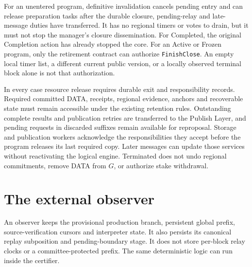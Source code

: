 \documentclass[11pt,a4paper]{article}
\begin{document}
For an unentered program, definitive invalidation cancels pending
entry and can release preparation tasks after the durable closure,
pending-relay and late-message duties have transferred. It has no
regional timers or votes to drain, but it must not stop the manager's
closure dissemination. For Completed, the original Completion action has
already stopped the core. For an Active or Frozen program, only the
retirement contract can authorize \texttt{FinishClose}. An empty local
timer list, a different current public version, or a locally observed
terminal block alone is not that authorization.

In every case resource release requires durable exit and responsibility
records. Required committed DATA, receipts, regional evidence, anchors
and recoverable state must remain accessible under the existing
retention rules. Outstanding complete results and publication retries
are transferred to the Publish Layer, and pending requests in discarded
suffixes remain available for reproposal. Storage and publication
workers acknowledge the responsibilities they accept before the
program releases its last required copy. Later messages can update
those services without reactivating the logical engine. Terminated
does not undo regional commitments, remove DATA from $G$, or authorize
stake withdrawal.





\section{The external observer}
\label{sec:observers}
An observer keeps the provisional production branch, persistent global
prefix, source-verification cursors and interpreter state. It also persists
its canonical replay subposition and pending-boundary stage. It does not
store per-block relay clocks or a committee-protected prefix.
The same deterministic logic can run inside the certifier.
\end{document}
